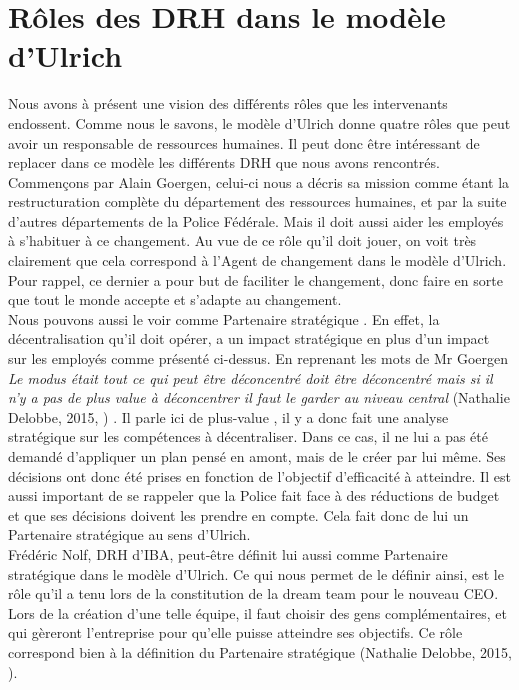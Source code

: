 \section{Rôles des DRH dans le modèle d'Ulrich}

Nous avons à présent une vision des différents rôles que les intervenants endossent. Comme nous le savons, le modèle d'Ulrich donne quatre rôles que peut avoir un responsable de ressources humaines. Il peut donc être intéressant de replacer dans ce modèle les différents DRH que nous avons rencontrés. \\

Commençons par Alain Goergen, celui-ci nous a décris sa mission comme étant la restructuration complète du département des ressources humaines, et par la suite d'autres départements de la Police Fédérale. Mais il doit aussi aider les employés à s'habituer à ce changement. Au vue de ce rôle qu'il doit jouer, on voit très clairement que cela correspond à l'\og Agent de changement \fg{} dans le modèle d'Ulrich. Pour rappel, ce dernier a pour but de faciliter le changement, donc faire en sorte que tout le monde accepte et s'adapte au changement.\\

Nous pouvons aussi le voir comme \og Partenaire stratégique \fg{}. En effet, la décentralisation qu'il doit opérer, a un impact stratégique en plus d'un impact sur les employés comme présenté ci-dessus. En reprenant les mots de Mr Goergen \textit{\og Le modus était tout ce qui peut être déconcentré doit être déconcentré mais si il n'y a pas de plus value à déconcentrer il faut le garder au niveau central \fg{}} (Nathalie Delobbe, 2015, \cite{tableronde}) . Il parle ici de \og plus-value \fg{}, il y a donc fait une analyse stratégique sur les compétences à décentraliser. Dans ce cas, il ne lui a pas été demandé d'appliquer un plan pensé en amont, mais de le créer par lui même. Ses décisions ont donc été prises en fonction de l'objectif d'efficacité à atteindre. Il est aussi important de se rappeler que la Police fait face à des réductions de budget et que ses décisions doivent les prendre en compte. Cela fait donc de lui un \og Partenaire stratégique \fg{} au sens d'Ulrich.\\   

Frédéric Nolf, DRH d'IBA, peut-être définit lui aussi comme \og{}Partenaire stratégique\fg{} dans le modèle d'Ulrich. Ce qui nous permet de le définir ainsi, est le rôle qu'il a tenu lors de la constitution de la \og dream team\fg{} pour le nouveau CEO. Lors de la création d'une telle équipe, il faut choisir des gens complémentaires, et qui gèreront l'entreprise pour qu'elle puisse atteindre ses objectifs. Ce rôle correspond bien à la définition du \og Partenaire stratégique \fg{} (Nathalie Delobbe, 2015, \cite{slidegrh}).\newline

